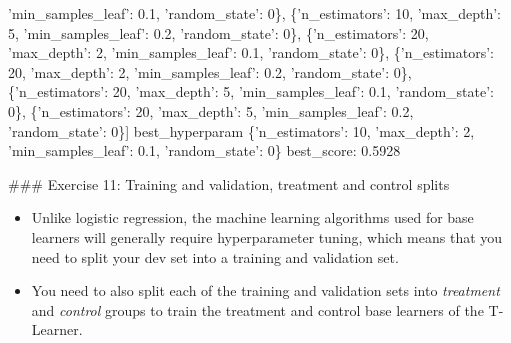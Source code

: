 \documentclass[11pt]{article}
\providecommand{\tightlist}{%
      \setlength{\itemsep}{0pt}\setlength{\parskip}{0pt}}
\newenvironment{Shaded}{}{}
\newcommand{\DecValTok}[1]{\textcolor[rgb]{0.25,0.63,0.44}{{#1}}}
\newcommand{\FloatTok}[1]{\textcolor[rgb]{0.25,0.63,0.44}{{#1}}}
\newcommand{\CharTok}[1]{\textcolor[rgb]{0.25,0.44,0.63}{{#1}}}
\newcommand{\NormalTok}[1]{{#1}}
\begin{document}
\begin{Shaded}
\begin{Highlighting}[]
  \CharTok{'min_samples_leaf'}\NormalTok{: }\FloatTok{0.1}\NormalTok{,}
  \CharTok{'random_state'}\NormalTok{: }\DecValTok{0}\NormalTok{\},}
\NormalTok{ \{}\CharTok{'n_estimators'}\NormalTok{: }\DecValTok{10}\NormalTok{,}
  \CharTok{'max_depth'}\NormalTok{: }\DecValTok{5}\NormalTok{,}
  \CharTok{'min_samples_leaf'}\NormalTok{: }\FloatTok{0.2}\NormalTok{,}
  \CharTok{'random_state'}\NormalTok{: }\DecValTok{0}\NormalTok{\},}
\NormalTok{ \{}\CharTok{'n_estimators'}\NormalTok{: }\DecValTok{20}\NormalTok{,}
  \CharTok{'max_depth'}\NormalTok{: }\DecValTok{2}\NormalTok{,}
  \CharTok{'min_samples_leaf'}\NormalTok{: }\FloatTok{0.1}\NormalTok{,}
  \CharTok{'random_state'}\NormalTok{: }\DecValTok{0}\NormalTok{\},}
\NormalTok{ \{}\CharTok{'n_estimators'}\NormalTok{: }\DecValTok{20}\NormalTok{,}
  \CharTok{'max_depth'}\NormalTok{: }\DecValTok{2}\NormalTok{,}
  \CharTok{'min_samples_leaf'}\NormalTok{: }\FloatTok{0.2}\NormalTok{,}
  \CharTok{'random_state'}\NormalTok{: }\DecValTok{0}\NormalTok{\},}
\NormalTok{ \{}\CharTok{'n_estimators'}\NormalTok{: }\DecValTok{20}\NormalTok{,}
  \CharTok{'max_depth'}\NormalTok{: }\DecValTok{5}\NormalTok{,}
  \CharTok{'min_samples_leaf'}\NormalTok{: }\FloatTok{0.1}\NormalTok{,}
  \CharTok{'random_state'}\NormalTok{: }\DecValTok{0}\NormalTok{\},}
\NormalTok{ \{}\CharTok{'n_estimators'}\NormalTok{: }\DecValTok{20}\NormalTok{,}
  \CharTok{'max_depth'}\NormalTok{: }\DecValTok{5}\NormalTok{,}
  \CharTok{'min_samples_leaf'}\NormalTok{: }\FloatTok{0.2}\NormalTok{,}
  \CharTok{'random_state'}\NormalTok{: }\DecValTok{0}\NormalTok{\}]}
\NormalTok{best_hyperparam}
\NormalTok{\{}\CharTok{'n_estimators'}\NormalTok{: }\DecValTok{10}\NormalTok{,}
 \CharTok{'max_depth'}\NormalTok{: }\DecValTok{2}\NormalTok{,}
 \CharTok{'min_samples_leaf'}\NormalTok{: }\FloatTok{0.1}\NormalTok{,}
 \CharTok{'random_state'}\NormalTok{: }\DecValTok{0}\NormalTok{\}}
\NormalTok{best_score: }\FloatTok{0.5928}
\end{Highlighting}
\end{Shaded}

     \#\#\# Exercise 11: Training and validation, treatment and control
splits

\begin{itemize}
\tightlist
\item
  Unlike logistic regression, the machine learning algorithms used for
  base learners will generally require hyperparameter tuning, which
  means that you need to split your dev set into a training and
  validation set.
\item
  You need to also split each of the training and validation sets into
  \emph{treatment} and \emph{control} groups to train the treatment and
  control base learners of the T-Learner.
\end{itemize}
\end{document}
